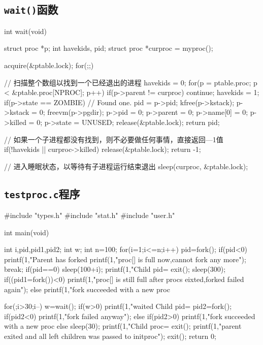 \documentclass{swfcthesismscctex}
\begin{document}
\subsection{\texttt{wait()}函数}
\label{sec:wait}

\begin{ccode}
int
wait(void)
{
  struct proc *p;
  int havekids, pid;
  struct proc *curproc = myproc();
  
  acquire(&ptable.lock);
  for(;;){
    // 扫描整个数组以找到一个已经退出的进程
    havekids = 0;
    for(p = ptable.proc; p < &ptable.proc[NPROC]; p++){
      if(p->parent != curproc)
        continue;
      havekids = 1;
      if(p->state == ZOMBIE){
        // Found one.
        pid = p->pid;
        kfree(p->kstack);
        p->kstack = 0;
        freevm(p->pgdir);
        p->pid = 0;
        p->parent = 0;
        p->name[0] = 0;
        p->killed = 0;
        p->state = UNUSED;
        release(&ptable.lock);
        return pid;
      }
    }

    // 如果一个子进程都没有找到，则不必要做任何事情，直接返回—1值
    if(!havekids || curproc->killed){
      release(&ptable.lock);
      return -1;
    }

    // 进入睡眠状态，以等待有子进程运行结束退出
    sleep(curproc, &ptable.lock);  
  }
}
\end{ccode}

\subsection{\texttt{testproc.c}程序}
\label{sec:testproc.c}
\begin{ccode}
#include "types.h"
#include "stat.h"
#include "user.h"

int main(void)
{
  int i,pid,pid1,pid2;
  int w;
  int n=100;
  for(i=1;i<=n;i++)
  {
    pid=fork();
    if(pid<0)
    {
      printf(1,"Parent has forked %
      printf(1,"proc[] is full now,cannot fork any more\n\n");
      break;
    }
    if(pid==0)
    {
      sleep(100+i);
      printf(1,"Child pid=%
      exit();
    }
  }
  sleep(300);
  if((pid1=fork())<0)
    printf(1,"proc[] is still full after procs eixted,forked failed again\n");
  else
    printf(1,"fork succeeded with a new proc %
  
  for(;i>30;i--)
  {
    w=wait();
    if(w>0)
      printf(1,"waited Child pid=%
  }
  pid2=fork();
  if(pid2<0)
    printf(1,"fork failed anyway\n");
  else if(pid2>0)
    printf(1,"fork succeeded with a new proc %
  else
  {
    sleep(30);
    printf(1,"Child proc=%
    exit();
  }
  printf(1,"parent exited and all left children was passed to initproc\n");
  exit();
  return 0;
}
\end{ccode}
\end{document}
